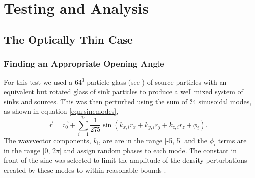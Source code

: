\chapter{Testing and Analysis}

\section{The Optically Thin Case}

\subsection{Finding an Appropriate Opening Angle}
\label{sec:bangForBuck}
For this test we used a $64^3$ particle glass (see \citet{wadsley2017}) of source particles with an equivalent but rotated glass of sink particles to produce a well mixed system of sinks and sources. This was then perturbed using the sum of 24 sinusoidal modes, as shown in equation \ref{eqn:sinemodes},
\begin{equation}
    \label{eqn:sinemodes}
    \overrightarrow{r} = \overrightarrow{r_0} + \sum_{i=1}^{24} \frac{1}{275} \sin(k_{x,i}r_x + k_{y,i}r_y + k_{z,i}r_z + \phi_i).
\end{equation}
The wavevector components, $k_i$, are are in the range [-5, 5] and the $\phi_i$ terms are in the range [0, 2$\pi$] and assign random phases to each mode. The constant in front of the sine was selected to limit the amplitude of the density perturbations created by these modes to within reasonable bounds \citep{grond}.


